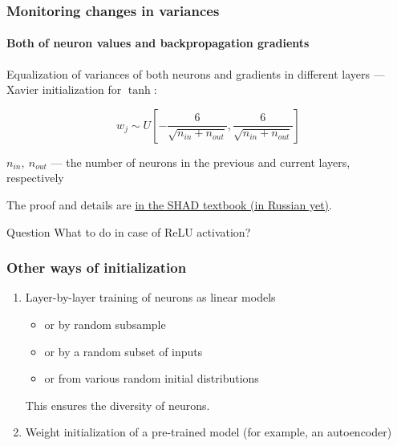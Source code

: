 \documentclass[fullscreen=true, bookmarks=true, hyperref={pdfencoding=unicode}]{beamer}
\begin{document}
\begin{frame}
  \frametitle{Monitoring changes in variances}
     \framesubtitle{Both of neuron values and backpropagation gradients}
   
   Equalization of variances of both neurons and gradients in different layers — Xavier initialization for $\tanh$:

   $$ w_j \sim U \left[ -\frac{{6}}{\sqrt{n_{in}+n_{out}}}, \frac{{6}}{\sqrt{n_{in}+n_ {out}}} \right]$$

   $n_{in},\ n_{out}$ — the number of neurons in the previous and current layers, respectively

   The proof and details are \href{https://ml-handbook.ru/chapters/neural_nets/training}{in the SHAD textbook (in Russian yet)}.
   \pause
   \begin{block}{Question}
   What to do in case of ReLU activation?
   \end{block}

\end{frame}


\begin{frame}
  \frametitle{Other ways of initialization}
   \begin{enumerate}
     \item Layer-by-layer training of neurons as linear models
       \begin{itemize}
         \item or by random subsample
         \item or by a random subset of inputs
         \item or from various random initial distributions
       \end{itemize}

     This ensures the diversity of neurons.

     \item Weight initialization of a pre-trained model (for example, an autoencoder)
   \end{enumerate}
\end{frame}
\end{document}
